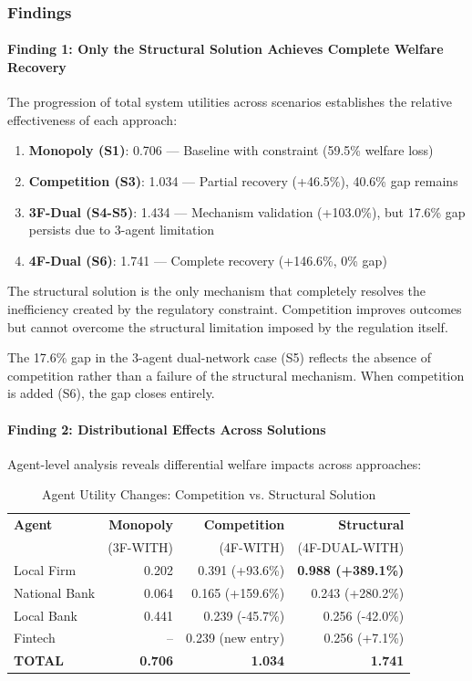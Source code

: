 \subsubsection{Findings}

\paragraph{Finding 1: Only the Structural Solution Achieves Complete Welfare Recovery}

The progression of total system utilities across scenarios establishes the relative effectiveness of each approach:

\begin{enumerate}
    \item \textbf{Monopoly (S1)}: 0.706 — Baseline with constraint (59.5\% welfare loss)
    \item \textbf{Competition (S3)}: 1.034 — Partial recovery (+46.5\%), 40.6\% gap remains
    \item \textbf{3F-Dual (S4-S5)}: 1.434 — Mechanism validation (+103.0\%), but 17.6\% gap persists due to 3-agent limitation
    \item \textbf{4F-Dual (S6)}: 1.741 — Complete recovery (+146.6\%, 0\% gap)
\end{enumerate}

The structural solution is the only mechanism that completely resolves the inefficiency created by the regulatory constraint. Competition improves outcomes but cannot overcome the structural limitation imposed by the regulation itself.

The 17.6\% gap in the 3-agent dual-network case (S5) reflects the absence of competition rather than a failure of the structural mechanism. When competition is added (S6), the gap closes entirely.

\paragraph{Finding 2: Distributional Effects Across Solutions}

Agent-level analysis reveals differential welfare impacts across approaches:

\begin{table}[h]
\centering
\caption{Agent Utility Changes: Competition vs. Structural Solution}
\label{tab:agent_utility_changes}
\begin{tabular}{lrrr}
\hline
\textbf{Agent} & \textbf{Monopoly} & \textbf{Competition} & \textbf{Structural} \\
 & (3F-WITH) & (4F-WITH) & (4F-DUAL-WITH) \\ \hline
Local Firm & 0.202 & 0.391 (+93.6\%) & \textbf{0.988 (+389.1\%)} \\
National Bank & 0.064 & 0.165 (+159.6\%) & 0.243 (+280.2\%) \\
Local Bank & 0.441 & 0.239 (-45.7\%) & 0.256 (-42.0\%) \\
Fintech & -- & 0.239 (new entry) & 0.256 (+7.1\%) \\
\hline
\textbf{TOTAL} & \textbf{0.706} & \textbf{1.034} & \textbf{1.741} \\
\hline
\end{tabular}
\end{table}

